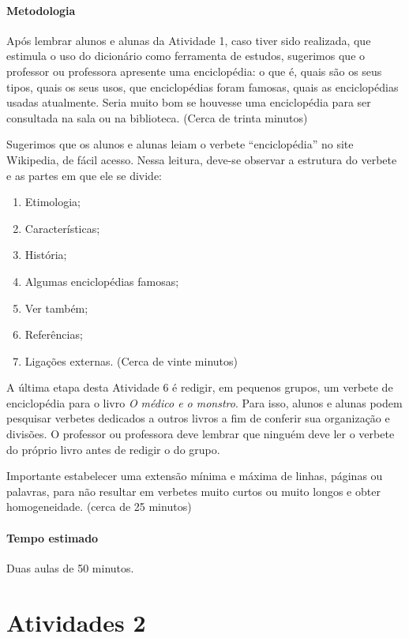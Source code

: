 \documentclass[12pt]{extarticle}
\begin{document}
{\paragraph{Metodologia}
Após lembrar alunos e alunas da Atividade 1, caso tiver sido realizada,
que estimula o uso do dicionário como ferramenta de estudos, sugerimos
que o professor ou professora apresente uma enciclopédia: o que é, quais
são os seus tipos, quais os seus usos, que enciclopédias foram famosas,
quais as enciclopédias usadas atualmente. Seria muito bom se houvesse
uma enciclopédia para ser consultada na sala ou na biblioteca. (Cerca de
trinta minutos)

Sugerimos que os alunos e alunas leiam o verbete ``enciclopédia'' no
site Wikipedia, de fácil acesso. Nessa leitura, deve-se observar a
estrutura do verbete e as partes em que ele se divide:
\begin{enumerate}
\item
Etimologia;
\item
Características;
\item
História;
\item
Algumas enciclopédias famosas;
\item 
Ver também;
\item
Referências;
\item
Ligações externas. (Cerca de vinte minutos)
\end{enumerate}

A última etapa desta Atividade 6 é redigir, em pequenos grupos, um
verbete de enciclopédia para o livro \emph{O médico e o monstro}. Para
isso, alunos e alunas podem pesquisar verbetes dedicados a outros livros
a fim de conferir sua organização e divisões. O professor ou professora
deve lembrar que ninguém deve ler o verbete do próprio livro antes de
redigir o do grupo.

Importante estabelecer uma extensão mínima e máxima de linhas, páginas
ou palavras, para não resultar em verbetes muito curtos ou muito longos
e obter homogeneidade. (cerca de 25 minutos)

\paragraph{Tempo estimado} Duas aulas de 50 minutos.

\section{Atividades 2}

}
\end{document}
